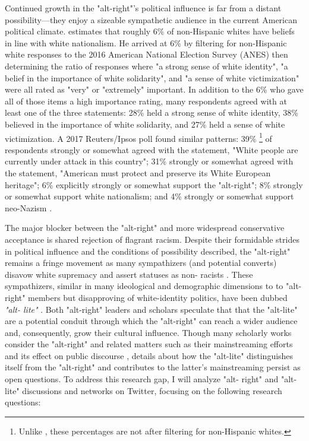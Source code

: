 \documentclass[acmlarge, screen, authorversion]{acmart}
\begin{document}
Continued growth in the "alt-right"'s political influence is far from a distant
possibility---they enjoy a sizeable sympathetic audience in the current
American political climate. \citet{hawleyDemographyAltRight2018} estimates that
roughly 6\% of non-Hispanic whites have beliefs in line with white nationalism.
He arrived at 6\% by filtering for non-Hispanic white responses to the 2016
American National Election Survey (ANES) then determining the ratio of
responses where "a strong sense of white identity", "a belief in the importance
of white solidarity", and "a sense of white victimization" were all rated as
"very" or "extremely" important. In addition to the 6\% who gave all of those items a
high importance rating, many respondents agreed with at least one of the three
statements: 28\% held a strong sense of white identity, 38\% believed in the
importance of white solidarity, and 27\% held a sense of white victimization. A
2017 Reuters/Ipsos poll found similar patterns: 39\% \footnote{Unlike
\citet{hawleyDemographyAltRight2018}, these percentages are not after filtering
for non-Hispanic whites.} of respondents strongly or somewhat agreed with the
statement, "White people are currently under attack in this country"; 31\%
strongly or somewhat agreed with the statement, "American must protect and
preserve its White European heritage"; 6\% explicitly strongly or somewhat
support the "alt-right"; 8\% strongly or somewhat support white nationalism;
and 4\% strongly or somewhat support neo-Nazism \cite{politicsNewPollAmericans}.

The major blocker between the "alt-right" and more widespread conservative
acceptance is shared
rejection of flagrant racism. Despite their formidable strides in political
influence and the
conditions of possibility described, the "alt-right" remains a fringe movement
as many sympathizers (and potential converts) disavow white supremacy and assert statuses as non-
racists \cite{mainRiseAltRight2018,
hawleyAltRightWhatEveryone2018}.
These sympathizers, similar in many ideological and demographic dimensions to
to "alt-right" members
but disapproving of white-identity politics, have been dubbed \textit{"alt-
lite"}
\cite{mainRiseAltRight2018, hawleyAltRightWhatEveryone2018}. Both "alt-right"
leaders and scholars
speculate that that the "alt-lite" are a potential conduit through which the
"alt-right" can reach a wider audience and, consequently, grow their cultural
influence. Though many scholarly works consider the "alt-right" \cite{mainRiseAltRight2018,
hawleyMakingSenseAltright2017, nagleKillAllNormies2017}
and related matters such as their mainstreaming
efforts \cite{gallaherMainstreamingWhiteSupremacy2020} and its effect on public
discourse
\cite{sternProudBoysWhite2019, cammaertsMainstreamingExtremeRightWing2018},
details about how the
"alt-lite" distinguishes itself from the "alt-right" and contributes to the
latter's mainstreaming
persist as open questions. To address this research gap, I will analyze "alt-
right" and "alt-lite"
discussions and networks on Twitter, focusing on the following research
questions:
\end{document}
